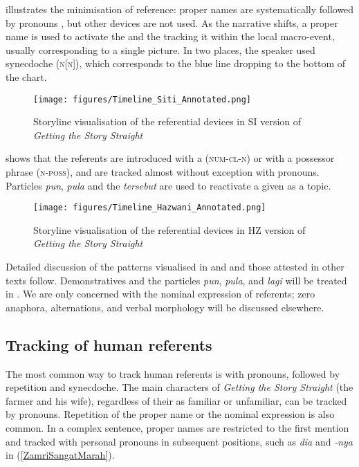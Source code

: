 \documentclass[output=paper
,modfonts
,nonflat]{langsci/langscibook}
\begin{document}
 illustrates the  minimisation of reference: proper names are systematically followed by pronouns \citep[cf.][260]{Heritage2007}, but other devices are not used. As the narrative shifts, a proper name is used to activate the  and the  tracking it within the local macro-event, usually corresponding to a single picture. In two places, the speaker used synecdoche (\textsc{n[n]}), which corresponds to the blue line dropping to the bottom of the chart.  

\begin{figure}
\texttt{[image: figures/Timeline\_Siti\_Annotated.png]}
\caption{Storyline visualisation of the referential devices in SI version of \emph{Getting the Story Straight}}\label{fig:GTSSTimelineSI}
\end{figure}

\noindent
{} shows that the referents are introduced with a  (\textsc{num-cl-n}) or with a possessor phrase (\textsc{n-poss}), and are tracked almost without exception with pronouns. Particles \emph{pun}, \emph{pula} and the  \emph{tersebut} are used to reactivate a given  as a topic.

\begin{figure}
\texttt{[image: figures/Timeline\_Hazwani\_Annotated.png]}
\caption{Storyline visualisation of the referential devices in HZ version of \emph{Getting the Story Straight}}\label{fig:GTSSTimelineHZ}
\end{figure}

Detailed discussion of the patterns visualised in  and  and those attested in other texts follow. Demonstratives and the particles \emph{pun}, \emph{pula}, and \emph{lagi} will be treated in . We are only concerned with the nominal expression of referents; zero anaphora,  alternations, and verbal morphology will be discussed elsewhere. 

\subsection{Tracking of human referents}\label{TrackHuman}
The most common way to track human referents is with pronouns, followed by repetition and synecdoche. 
The main characters of \emph{Getting the Story Straight} (the farmer and his wife), regardless of their  as familiar or unfamiliar, can be tracked by pronouns. Repetition of the proper name or the nominal expression is also common. In a complex sentence, proper names are restricted to the first mention and tracked with personal pronouns in subsequent positions, such as \emph{dia} and \emph{-nya} in (\ref{ZamriSangatMarah}).
\end{document}
